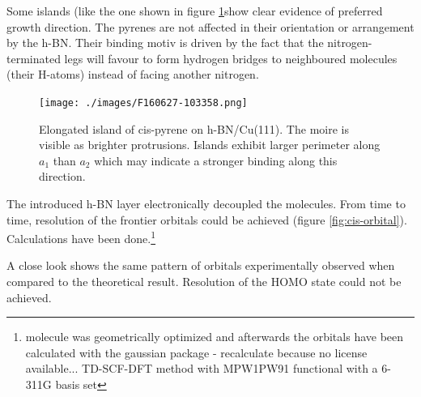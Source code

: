 Some islands (like the one shown in figure \ref{fig:cis-stripe}show clear evidence of preferred growth direction. The pyrenes are not affected in their orientation or arrangement by the h-BN. Their binding motiv is driven by the fact that the nitrogen-terminated legs will favour to form hydrogen bridges to neighboured molecules (their H-atoms) instead of facing another nitrogen.

\begin{figure}[!h]
\centering
 \texttt{[image: ./images/F160627-103358.png]}
 \caption{Elongated island of cis-pyrene on h-BN/Cu(111). The moire is visible as brighter protrusions. Islands exhibit larger perimeter along $a_1$ than $a_2$ which may indicate a stronger binding along this direction.} 
\label{fig:cis-stripe}
\end{figure}

The introduced h-BN layer electronically decoupled the molecules. From time to time, resolution of the frontier orbitals could be achieved (figure \ref{fig:cis-orbital}). Calculations have been done.\footnote{molecule was geometrically optimized and afterwards the orbitals have been calculated with the gaussian package - recalculate because no license available... TD-SCF-DFT method with MPW1PW91 functional with a 6-311G basis set}

A close look shows the same pattern of orbitals experimentally observed when compared to the theoretical result. Resolution of the HOMO state could not be achieved.

